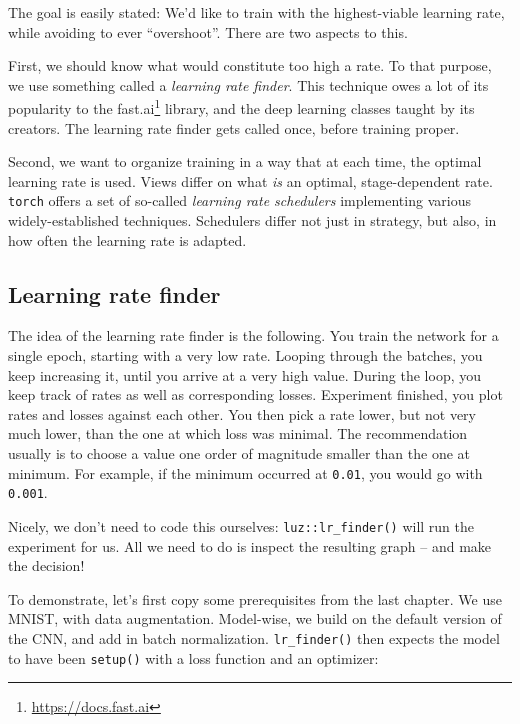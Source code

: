 \documentclass[
  letterpaper,
]{krantz}
\DeclareRobustCommand{\href}[2]{#2\footnote{\url{#1}}}
\begin{document}
The goal is easily stated: We'd like to train with the highest-viable
learning rate, while avoiding to ever ``overshoot''. There are two
aspects to this.

First, we should know what would constitute too high a rate. To that
purpose, we use something called a \emph{learning rate
finder}. This technique owes a lot of its
popularity to the \href{https://docs.fast.ai}{fast.ai} library, and the
deep learning classes taught by its creators. The learning rate finder
gets called once, before training proper.

Second, we want to organize training in a way that at each time, the
optimal learning rate is used. Views differ on what \emph{is} an
optimal, stage-dependent rate. \texttt{torch} offers a set of so-called
\emph{learning rate schedulers} implementing various widely-established
techniques. Schedulers differ not just in strategy, but also, in how
often the learning rate is adapted.

\hypertarget{learning-rate-finder}{%
\subsection{Learning rate finder}\label{learning-rate-finder}}

The idea of the learning rate finder is the following. You train the
network for a single epoch, starting with a very low rate. Looping
through the batches, you keep increasing it, until you arrive at a very
high value. During the loop, you keep track of rates as well as
corresponding losses. Experiment finished, you plot rates and losses
against each other. You then pick a rate lower, but not very much lower,
than the one at which loss was minimal. The recommendation usually is to
choose a value one order of magnitude smaller than the one at minimum.
For example, if the minimum occurred at \texttt{0.01}, you would go with
\texttt{0.001}.

Nicely, we don't need to code this ourselves:
\texttt{luz::lr\_finder()}
will run the experiment for us. All we need to do is inspect the
resulting graph -- and make the decision!

To demonstrate, let's first copy some prerequisites from the last
chapter. We use MNIST, with data augmentation. Model-wise, we build on
the default version of the CNN, and add in batch normalization.
\texttt{lr\_finder()} then expects the model to have been
\texttt{setup()} with a loss function and an optimizer:
\end{document}
